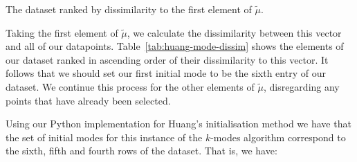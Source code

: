 \begin{example}
    \begin{table}[H]
    \centering
    \singlespacing{%
    \resizebox{.8\textwidth}{!}{%
        
    }}
    \caption{The dataset ranked by dissimilarity to the first element of
    \(\tilde{\mu}\).}\label{tab:huang-mode-dissim}
    \end{table}

    Taking the first element of \(\tilde{\mu}\), we calculate the dissimilarity
    between this vector and all of our datapoints.
    Table~\ref{tab:huang-mode-dissim} shows the elements of our dataset ranked
    in ascending order of their dissimilarity to this vector. It follows that we
    should set our first initial mode to be the sixth entry of our dataset. We
    continue this process for the other elements of \(\tilde{\mu}\),
    disregarding any points that have already been selected.
    
    Using our Python implementation for Huang's initialisation method we have 
    that the set of initial modes for this instance of the \(k\)-modes algorithm
    correspond to the sixth, fifth and fourth rows of the dataset. That is, we
    have:

    
\end{example}


